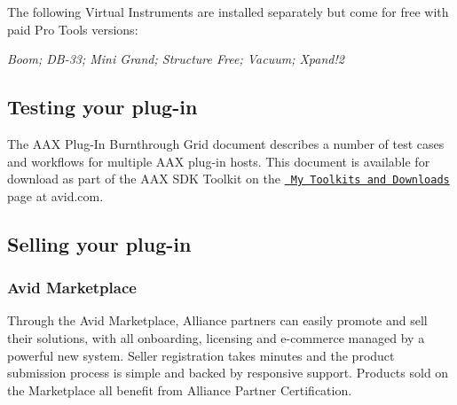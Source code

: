 \begin{DoxyItemize}
\begin{DoxyItemize}
The following Virtual Instruments are installed separately but come for free with paid Pro Tools versions\+:


\begin{DoxyItemize}
\item {\itshape Boom; D\+B-\/33; Mini Grand; Structure Free; Vacuum; Xpand!2}  
\end{DoxyItemize}
\end{DoxyItemize}
\end{DoxyItemize}



 \hypertarget{a00843_aax_distributing_testing}{}\subsection{Testing your plug-\/in}\label{a00843_aax_distributing_testing}
 The A\+AX Plug-\/\+In Burnthrough Grid document describes a number of test cases and workflows for multiple A\+AX plug-\/in hosts. This document is available for download as part of the A\+AX S\+DK Toolkit on the \href{https://my.avid.com/products/cppsdk}{\texttt{ My Toolkits and Downloads}} page at avid.\+com.



 \hypertarget{a00843_aax_distributing_selling}{}\subsection{Selling your plug-\/in}\label{a00843_aax_distributing_selling}
 \hypertarget{a00843_aax_distributing_selling_avidmarketplace}{}\subsubsection{Avid Marketplace}\label{a00843_aax_distributing_selling_avidmarketplace}
 Through the Avid Marketplace, Alliance partners can easily promote and sell their solutions, with all onboarding, licensing and e-\/commerce managed by a powerful new system. Seller registration takes minutes and the product submission process is simple and backed by responsive support. Products sold on the Marketplace all benefit from Alliance Partner Certification.

